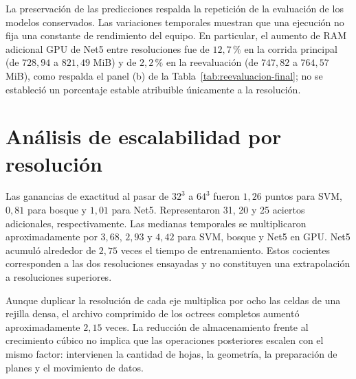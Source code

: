 La preservación de las predicciones respalda la repetición de la evaluación de los modelos conservados. Las variaciones temporales muestran que una ejecución no fija una constante de rendimiento del equipo. En particular, el aumento de RAM adicional GPU de Net5 entre resoluciones fue de $12{,}7\,\%$ en la corrida principal (de $728{,}94$ a $821{,}49$ MiB) y de $2{,}2\,\%$ en la reevaluación (de $747{,}82$ a $764{,}57$ MiB), como respalda el panel (b) de la Tabla~\ref{tab:reevaluacion-final}; no se estableció un porcentaje estable atribuible únicamente a la resolución.

\section{Análisis de escalabilidad por resolución}
\label{sec:escalabilidad}
Las ganancias de exactitud al pasar de $32^3$ a $64^3$ fueron $1{,}26$ puntos para SVM, $0{,}81$ para bosque y $1{,}01$ para Net5. Representaron 31, 20 y 25 aciertos adicionales, respectivamente. Las medianas temporales se multiplicaron aproximadamente por $3{,}68$, $2{,}93$ y $4{,}42$ para SVM, bosque y Net5 en GPU. Net5 acumuló alrededor de $2{,}75$ veces el tiempo de entrenamiento. Estos cocientes corresponden a las dos resoluciones ensayadas y no constituyen una extrapolación a resoluciones superiores.

Aunque duplicar la resolución de cada eje multiplica por ocho las celdas de una rejilla densa, el archivo comprimido de los octrees completos aumentó aproximadamente $2{,}15$ veces. La reducción de almacenamiento frente al crecimiento cúbico no implica que las operaciones posteriores escalen con el mismo factor: intervienen la cantidad de hojas, la geometría, la preparación de planes y el movimiento de datos.

